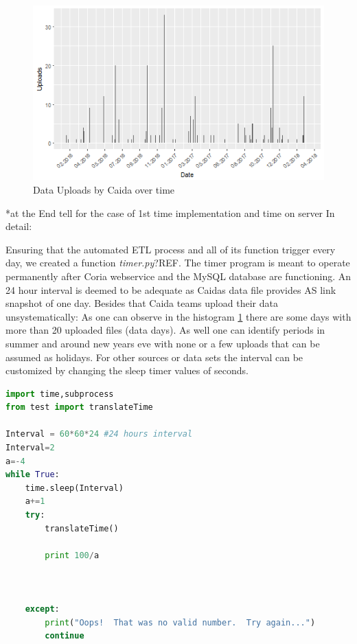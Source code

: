 \documentclass[conference, 11pt]{IEEEtran}
\begin{document}
\begin{figure}[htbp]
\centerline{\includegraphics[scale=0.5]{Graphics/uploadFrequency.png}}
\caption{Data Uploads by Caida over time}
\label{fig:UploadOverTime}
\end{figure}
 

*at the End tell for the case of 1st time implementation and time on server
In detail:

Ensuring that the automated ETL process and all of its function trigger every day, we created a function \textit{timer.py}?REF. The timer program is meant to operate permanently after Coria webservice and the MySQL database are functioning.
An 24 hour interval is deemed to be adequate as Caida\textsc{}s data file provides AS link snapshot of one day. Besides that Caida teams upload their data unsystematically: As one can observe in the histogram \ref{fig:UploadOverTime} there are some days with more than 20 uploaded files (data days). As well one can identify periods in summer and around new years eve with none or a few uploads that can be assumed as holidays.
For other sources or data sets the interval can be customized by changing the sleep timer values of seconds.

\begin{lstlisting}[language=Python]
import time,subprocess
from test import translateTime

Interval = 60*60*24 #24 hours interval
Interval=2
a=-4
while True:
	time.sleep(Interval)
	a+=1
	try:
		translateTime()

		print 100/a
		


	except:
		print("Oops!  That was no valid number.  Try again...")
		continue
\end{lstlisting}
\end{document}
